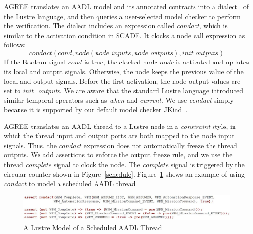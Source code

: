 AGREE translates an AADL model and its annotated contracts into a dialect~\cite{jkind} of the Lustre language, and then queries a user-selected model checker to perform the verification. The dialect includes an expression called \emph{condact}, which is similar to the activation condition in SCADE. It clocks a node call expression as follows: 
\begin{equation*}
condact (cond, node(node\_inputs, node\_outputs), init\_outputs)
\end{equation*}
If the Boolean signal $cond$ is true, the clocked node $node$ is activated and updates its local and output signals. Otherwise, the node keeps the previous value of the local and output signals. Before the first activation, the node output values are set to \emph{init\_outputs}. %
We are aware that the standard Lustre language introduced similar temporal operators such as \emph{when} and \emph{current}. We use \emph{condact} simply because it is supported by our default model checker JKind~\cite{jkind}.

AGREE translates an AADL thread to a Lustre node in a \emph{constraint} style, in which the thread input and output ports are both mapped to the node input signals. Thus, the \emph{condact} expression does not automatically freeze the thread outputs. We add assertions to enforce the output freeze rule, and we use the thread \emph{complete} signal to clock the node. The \emph{complete} signal is triggered by the circular counter shown in Figure~\ref{schedule}. Figure~\ref{WPMlustre} shows an example of using \emph{condact} to model a scheduled AADL thread. 

\begin{figure}[ht!]
\centering
\includegraphics[width=120mm]{lustreAsync5.jpg}
\caption{A Lustre Model of a Scheduled AADL Thread \label{WPMlustre}}
\end{figure}

%
%

